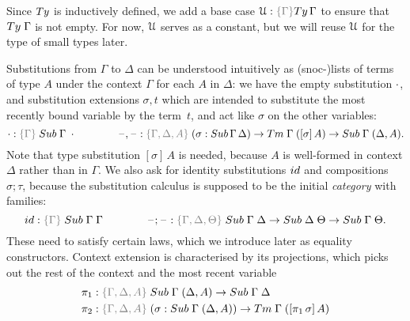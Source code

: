 \documentclass[a4paper,UKenglish,numberwithinsect,cleveref,thm-restate]{lipics-v2021}
\begin{document}
Since $\Ty$ is inductively defined, we add a base case $\UU : \implicit{\Gamma} \Ty\,\Gamma$ to ensure that $\Ty\;\Gamma$ is not empty.
%
For now, $\mathcal{U}$ serves as a constant, but we will reuse $\mathcal{U}$ for the type of small types later.

Substitutions from $\Gamma$ to $\Delta$ can be understood intuitively as (snoc-)lists of terms of type $A$ under the context $\Gamma$ for each $A$ in $\Delta$: we have the empty substitution $\cdot$, and substitution extensions $\sigma, t$ which are intended to substitute the most recently bound variable by the term~$t$, and act like $\sigma$ on the other variables:
\[
  \emptysub : \implicit{\Gamma}\;\Sub\;\Gamma\;\emptyctx
  \qquad\qquad
  \blank,\blank : \implicit{\Gamma, \Delta, A}\; (\sigma : \Sub\,\Gamma\,\Delta) \to \Tm\;\Gamma\;([ \sigma ]\, A) \to \Sub\;\Gamma\;(\Delta, A).
\]
Note that type substitution $[\sigma]\,A$ is needed, because $A$ is well-formed in context $\Delta$ rather than in $\Gamma$.
We also ask for identity substitutions $\idS$ and compositions $\sigma;\tau$, because the substitution calculus is supposed to be the initial \emph{category} with families:
\[
  \idS : \implicit{\Gamma}\; \Sub\;\Gamma\;\Gamma
  \qquad\qquad \blank;\blank : \implicit{\Gamma, \Delta, \Theta}\;\Sub\;\Gamma\;\Delta \to \Sub\;\Delta\;\Theta \to \Sub\;\Gamma\;\Theta.
\]
These need to satisfy certain laws, which we introduce later as equality constructors.
Context extension is characterised by its projections, which picks out the rest of the context and the most recent variable
\begin{alignat*}{3}
  \pi_1 & : \implicit{\Gamma, \Delta, A}\;\Sub\;\Gamma\;(\Delta, A) \to \Sub\;\Gamma\;\Delta \\
  \pi_2 & : \implicit{\Gamma, \Delta, A}\;(\sigma : \Sub\;\Gamma\;(\Delta, A)) \to \Tm\;\Gamma\;([ \pi_1\,\sigma ]\, A)
\end{alignat*}
\end{document}
